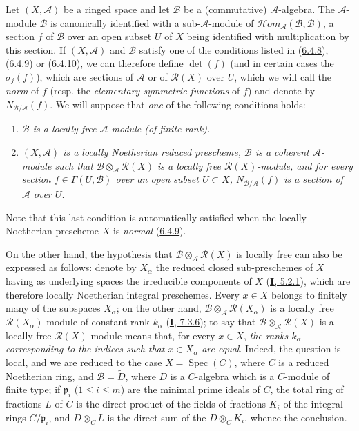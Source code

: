 \begin{env}[6.5.1]
\label{II.6.5.1}
Let $(X,\mathcal{A})$ be a ringed space and let $\mathcal{B}$ be a
(commutative) $\mathcal{A}$-algebra. The $\mathcal{A}$-module $\mathcal{B}$
is canonically identified with a sub-$\mathcal{A}$-module of
$\mathcal{H}om_{\mathcal{A}}(\mathcal{B},\mathcal{B})$, a section $f$ of
$\mathcal{B}$ over an open subset $U$ of $X$ being identified with
multiplication by this section. If $(X,\mathcal{A})$ and $\mathcal{B}$
satisfy one of the conditions listed in
(\hyperref[II.6.4.8]{6.4.8}), (\hyperref[II.6.4.9]{6.4.9}) or
(\hyperref[II.6.4.10]{6.4.10}), we can therefore define $\det(f)$ (and in
certain cases the $\sigma_j(f)$), which are sections of $\mathcal{A}$ or of
$\mathcal{R}(X)$ over $U$, which we will call the \emph{norm} of $f$ (resp.
the \emph{elementary symmetric functions} of $f$) and denote by
$N_{\mathcal{B}/\mathcal{A}}(f)$. We will suppose that \emph{one} of the
following conditions holds:
\begin{enumerate}
\item[(I)] \emph{$\mathcal{B}$ is a locally free $\mathcal{A}$-module
(of finite rank).}
\item[(II)] \emph{$(X,\mathcal{A})$ is a locally Noetherian reduced
prescheme, $\mathcal{B}$ is a coherent $\mathcal{A}$-module such that
$\mathcal{B}\otimes_{\mathcal{A}}\mathcal{R}(X)$ is a locally free
$\mathcal{R}(X)$-module, and for every section
$f\in\Gamma(U,\mathcal{B})$ over an open subset $U\subset X$,
$N_{\mathcal{B}/\mathcal{A}}(f)$ is a section of $\mathcal{A}$ over $U$.}
\end{enumerate}


Note that this last condition is automatically satisfied when the locally
Noetherian prescheme $X$ is \emph{normal}
(\hyperref[II.6.4.9]{6.4.9}).

On the other hand, the hypothesis that
$\mathcal{B}\otimes_{\mathcal{A}}\mathcal{R}(X)$ is locally free can also be
expressed as follows: denote by $X_\alpha$ the reduced closed sub-preschemes
of $X$ having as underlying spaces the irreducible components of $X$
(\hyperref[I.5.2.1]{\textbf{I}, 5.2.1}), which are therefore locally Noetherian
integral preschemes. Every $x\in X$ belongs to finitely many of the
subspaces $X_\alpha$; on the other hand,
$\mathcal{B}\otimes_{\mathcal{A}}\mathcal{R}(X_\alpha)$ is a locally free
$\mathcal{R}(X_\alpha)$-module of constant rank $k_\alpha$
(\hyperref[I.7.3.6]{\textbf{I}, 7.3.6}); to say that
$\mathcal{B}\otimes_{\mathcal{A}}\mathcal{R}(X)$ is a locally free
$\mathcal{R}(X)$-module means that, for every $x\in X$, \emph{the ranks
$k_\alpha$ corresponding to the indices such that $x\in X_\alpha$ are
equal}. Indeed, the question is local, and we are reduced to the case
$X=\operatorname{Spec}(C)$, where $C$ is a reduced Noetherian ring, and
$\mathcal{B}=\widetilde{D}$, where $D$ is a $C$-algebra which is a
$C$-module of finite type; if $\mathfrak{p}_i$ ($1\leq i\leq m$) are the
minimal prime ideals of $C$, the total ring of fractions $L$ of $C$ is the
direct product of the fields of fractions $K_i$ of the integral rings
$C/\mathfrak{p}_i$, and $D\otimes_C L$ is the direct sum of the
$D\otimes_C K_i$, whence the conclusion.


\end{env}
